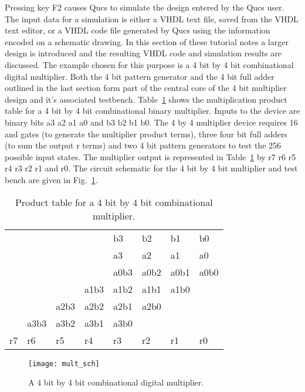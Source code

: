 Pressing key F2 causes Qucs to simulate the design entered by the Qucs
user. The input data for a simulation is either a VHDL text file,
saved from the VHDL text editor, or a VHDL code file generated by Qucs
using the information encoded on a schematic drawing.  In this section
of these tutorial notes a larger design is introduced and the
resulting VHDL code and simulation results are discussed.  The example
chosen for this purpose is a 4 bit by 4 bit combinational digital
multiplier.  Both the 4 bit pattern generator and the 4 bit full adder
outlined in the last section form part of the central core of the 4
bit multiplier design and it's associated testbench.
Table~\ref{tab:mult1} shows the multiplication product table for a 4
bit by 4 bit combinational binary multiplier.  Inputs to the device
are binary bits a3 a2 a1 a0 and b3 b2 b1 b0.  The 4 by 4 multiplier
device requires 16 and gates (to generate the multiplier product
terms), three four bit full adders (to sum the output r terms) and two
4 bit pattern generators to test the 256 possible input states. The
multiplier output is represented in Table~\ref{tab:mult1} by r7 r6 r5
r4 r3 r2 r1 and r0. The circuit schematic for the 4 bit by 4 bit
multiplier and test bench are given in Fig.~\ref{fig:mult_sch}.

\begin{table}
\centering
\begin{tabular}{llllllll}
 &   &   &   & b3 & b2 & b1 & b0 \\ 
  &   &   &   & a3 & a2 & a1 & a0 \\ 
  &   &   &   & a0b3 & a0b2 & a0b1 & a0b0 \\ 
  &   &   & a1b3 & a1b2 & a1b1 & a1b0 &   \\ 
  &   & a2b3 & a2b2 & a2b1 & a2b0 &   &   \\ 
  & a3b3 & a3b2 & a3b1 & a3b0 &   &   &   \\ 
r7 & r6 & r5 & r4 & r3 & r2 & r1 & r0
\end{tabular}
\caption{Product table for a 4 bit by 4 bit combinational multiplier.}
\label{tab:mult1}
\end{table}

\FloatBarrier
\begin{figure}[ht]
  \centering
  \texttt{[image: mult\_sch]}
  \caption{A 4 bit by 4 bit combinational digital multiplier.}
  \label{fig:mult_sch}
\end{figure} 

\addvspace{12pt}

